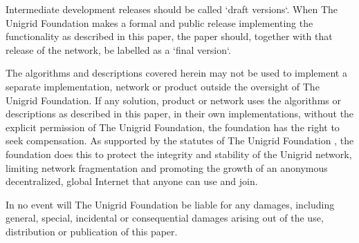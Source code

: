 \documentclass[10pt,a4paper,final]{article}
\begin{document}
Intermediate development releases should be called `draft versions`. When The Unigrid Foundation makes a formal and public release implementing the functionality as described in this paper, the paper should, together with that release of the network, be labelled as a `final version`.

The algorithms and descriptions covered herein may not be used to implement a separate implementation, network or product outside the oversight of The Unigrid Foundation. If any solution, product or network uses the algorithms or descriptions as described in this paper, in their own implementations, without the explicit permission of The Unigrid Foundation, the foundation has the right to seek compensation. As supported by the statutes of The Unigrid Foundation \cite{unigridstatutes}, the foundation does this to protect the integrity and stability of the Unigrid network, limiting network fragmentation and promoting the growth of an anonymous decentralized, global Internet that anyone can use and join.

In no event will The Unigrid Foundation be liable for any damages, including general, special, incidental or consequential damages arising out of the use, distribution or publication of this paper.

\clearpage
\end{document}
